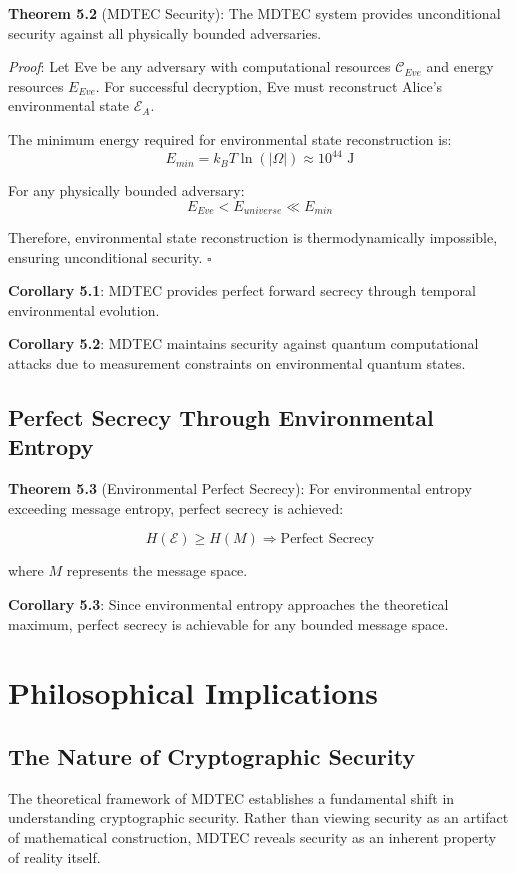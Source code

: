 \documentclass[12pt]{article}
\begin{document}
\textbf{Theorem 5.2} (MDTEC Security): The MDTEC system provides unconditional security against all physically bounded adversaries.

\textit{Proof}: Let Eve be any adversary with computational resources $\mathcal{C}_{Eve}$ and energy resources $E_{Eve}$. For successful decryption, Eve must reconstruct Alice's environmental state $\mathcal{E}_A$.

The minimum energy required for environmental state reconstruction is:
$$E_{min} = k_B T \ln(|\Omega|) \approx 10^{44} \text{ J}$$

For any physically bounded adversary:
$$E_{Eve} < E_{universe} \ll E_{min}$$

Therefore, environmental state reconstruction is thermodynamically impossible, ensuring unconditional security. $\square$

\textbf{Corollary 5.1}: MDTEC provides perfect forward secrecy through temporal environmental evolution.

\textbf{Corollary 5.2}: MDTEC maintains security against quantum computational attacks due to measurement constraints on environmental quantum states.

\subsection{Perfect Secrecy Through Environmental Entropy}

\textbf{Theorem 5.3} (Environmental Perfect Secrecy): For environmental entropy exceeding message entropy, perfect secrecy is achieved:

$$H(\mathcal{E}) \geq H(M) \Rightarrow \text{Perfect Secrecy}$$

where $M$ represents the message space.

\textbf{Corollary 5.3}: Since environmental entropy approaches the theoretical maximum, perfect secrecy is achievable for any bounded message space.

\section{Philosophical Implications}

\subsection{The Nature of Cryptographic Security}

The theoretical framework of MDTEC establishes a fundamental shift in understanding cryptographic security. Rather than viewing security as an artifact of mathematical construction, MDTEC reveals security as an inherent property of reality itself.
\end{document}
